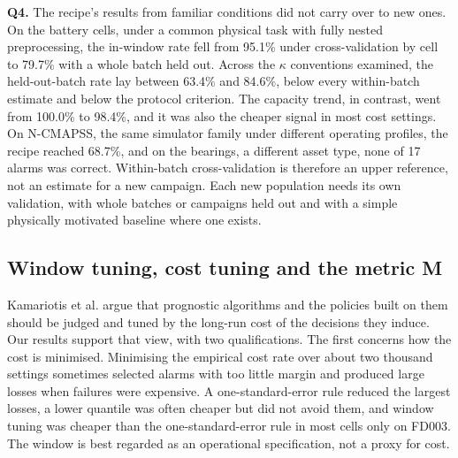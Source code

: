 \documentclass[a4paper,fleqn,doubleblind]{cas-dc}
\begin{document}
\textbf{Q4.} The recipe's results from familiar conditions did not carry over to new ones. On the battery cells, under a common physical task with fully nested preprocessing, the in-window rate fell from 95.1\% under cross-validation by cell to 79.7\% with a whole batch held out. Across the $\kappa$ conventions examined, the held-out-batch rate lay between 63.4\% and 84.6\%, below every within-batch estimate and below the protocol criterion. The capacity trend, in contrast, went from 100.0\% to 98.4\%, and it was also the cheaper signal in most cost settings. On N-CMAPSS, the same simulator family under different operating profiles, the recipe reached 68.7\%, and on the bearings, a different asset type, none of 17 alarms was correct. Within-batch cross-validation is therefore an upper reference, not an estimate for a new campaign. Each new population needs its own validation, with whole batches or campaigns held out and with a simple physically motivated baseline where one exists.

\subsection{Window tuning, cost tuning and the metric M}

Kamariotis et al. \cite{kamariotis2024} argue that prognostic algorithms and the policies built on them should be judged and tuned by the long-run cost of the decisions they induce. Our results support that view, with two qualifications. The first concerns how the cost is minimised. Minimising the empirical cost rate over about two thousand settings sometimes selected alarms with too little margin and produced large losses when failures were expensive. A one-standard-error rule reduced the largest losses, a lower quantile was often cheaper but did not avoid them, and window tuning was cheaper than the one-standard-error rule in most cells only on FD003. The window is best regarded as an operational specification, not a proxy for cost.
\end{document}
